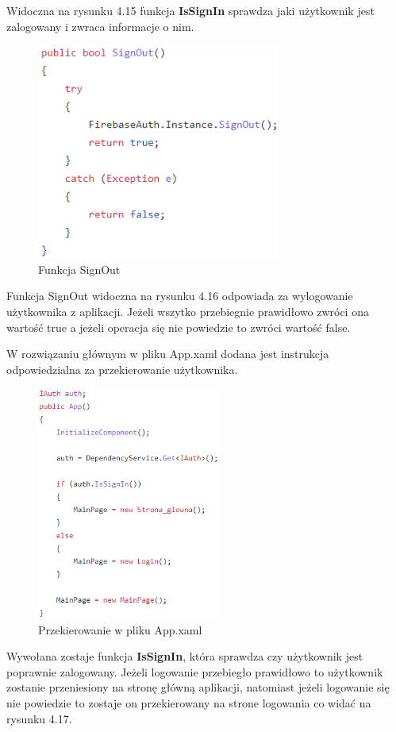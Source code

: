 Widoczna na rysunku 4.15 funkcja \textbf{IsSignIn} sprawdza jaki użytkownik jest zalogowany i zwraca informacje o nim.

\begin{figure}[!htb]
	\begin{center}
		\includegraphics[width=8cm]{rys/authdroid4.png}
		\caption{Funkcja SignOut}
		\label{rys:rysunek027}
	\end{center}
\end{figure}       

Funkcja SignOut widoczna na rysunku 4.16 odpowiada za wylogowanie użytkownika z aplikacji. Jeżeli wszytko przebiegnie prawidłowo zwróci ona wartość true a jeżeli operacja się nie powiedzie to zwróci wartość false. \newline \newline 

W rozwiązaniu głównym w pliku App.xaml dodana jest instrukcja odpowiedzialna za przekierowanie użytkownika. \newline \newline

\begin{figure}[!htb]
	\begin{center}
		\includegraphics[width=6cm]{rys/firebase_app_xaml.png}
		\caption{Przekierowanie w pliku App.xaml}
		\label{rys:rysunek028}
	\end{center}
\end{figure}

Wywołana zostaje funkcja \textbf{IsSignIn}, która sprawdza czy użytkownik jest poprawnie zalogowany. Jeżeli logowanie przebiegło prawidłowo to użytkownik zostanie przeniesiony na stronę główną aplikacji, natomiast jeżeli logowanie się nie powiedzie to zostaje on przekierowany na strone logowania co widać na rysunku 4.17.   
